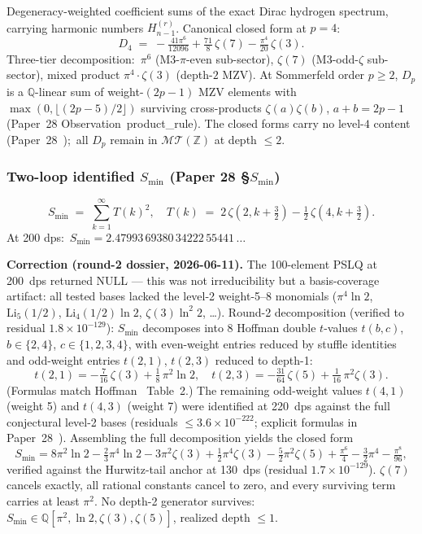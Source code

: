 \documentclass[11pt,a4paper]{article}
\theoremstyle{plain}
\theoremstyle{definition}
\newcommand{\Z}{\mathbb{Z}}
\newcommand{\Q}{\mathbb{Q}}
\newcommand{\MT}{\mathcal{MT}}
\begin{document}
Degeneracy-weighted coefficient sums of the exact Dirac hydrogen
spectrum, carrying harmonic numbers $H_{n-1}^{(r)}$.  Canonical closed form at $p = 4$:
\[
D_4 \;=\; -\tfrac{41\pi^6}{12096} + \tfrac{71}{8}\,\zeta(7)
        - \tfrac{\pi^4}{20}\,\zeta(3).
\]
Three-tier decomposition:\ $\pi^6$ (M3-$\pi$-even sub-sector),
$\zeta(7)$ (M3-odd-$\zeta$ sub-sector), mixed product
$\pi^4 \cdot \zeta(3)$ (depth-$2$ MZV).  At Sommerfeld order $p \ge 2$,
$D_p$ is a $\Q$-linear sum of weight-$(2p-1)$ MZV elements with
$\max(0, \lfloor (2p-5)/2 \rfloor)$ surviving cross-products
$\zeta(a)\zeta(b)$, $a + b = 2p-1$ (Paper~28
Observation~product\_rule).  The closed forms carry no level-$4$
content (Paper~28~\cite{loutey_paper28});\ all $D_p$ remain in $\MT(\Z)$
at depth $\le 2$.

\subsubsection{Two-loop identified $S_{\min}$ (Paper 28 \S $S_{\min}$)}
\label{subsec:m3_smin_witness}

\[
S_{\min} \;=\; \sum_{k=1}^\infty T(k)^2, \quad
T(k) \;=\; 2\,\zeta(2, k+\tfrac{3}{2}) - \tfrac{1}{2}\,\zeta(4, k+\tfrac{3}{2}).
\]
At 200 dps:\ $S_{\min} = 2.47993\,69380\,34222\,55441\,\ldots$

\textbf{Correction (round-2 dossier, 2026-06-11).}  The 100-element PSLQ
at 200~dps returned NULL --- this was not irreducibility but a
basis-coverage artifact: all tested bases lacked the level-2
weight-5--8 monomials ($\pi^4\ln 2$, $\mathrm{Li}_5(1/2)$,
$\mathrm{Li}_4(1/2)\ln 2$, $\zeta(3)\ln^2 2$, \ldots).
Round-2 decomposition (verified to residual $1.8\times10^{-129}$):
$S_{\min}$ decomposes into 8 Hoffman double $t$-values
$t(b,c)$, $b \in \{2,4\}$, $c \in \{1,2,3,4\}$, with
even-weight entries reduced by stuffle identities and odd-weight
entries $t(2,1)$, $t(2,3)$ reduced to depth-1:
\[
t(2,1) = -\tfrac{7}{16}\,\zeta(3) + \tfrac{1}{8}\,\pi^2\ln 2, \quad
t(2,3) = -\tfrac{31}{64}\,\zeta(5) + \tfrac{1}{16}\,\pi^2\zeta(3).
\]
(Formulas match Hoffman~\cite{hoffman2019odd} Table~2.)
The remaining odd-weight values $t(4,1)$ (weight 5) and $t(4,3)$
(weight 7) were identified at 220~dps against the full conjectural
level-2 bases (residuals $\le 3.6\times10^{-222}$; explicit formulas
in Paper~28~\cite{loutey_paper28}).  Assembling the full decomposition
yields the closed form
\[
S_{\min} = 8\pi^2\ln 2 - \tfrac{2}{3}\pi^4\ln 2 - 3\pi^2\zeta(3)
  + \tfrac{1}{2}\pi^4\zeta(3) - \tfrac{5}{2}\pi^2\zeta(5)
  + \tfrac{\pi^6}{4} - \tfrac{3}{2}\pi^4 - \tfrac{\pi^8}{96},
\]
verified against the Hurwitz-tail anchor at 130~dps (residual
$1.7\times10^{-129}$).  $\zeta(7)$ cancels exactly, all rational
constants cancel to zero, and every surviving term carries at least
$\pi^2$.  No depth-2 generator survives:\ $S_{\min} \in
\Q[\pi^2, \ln 2, \zeta(3), \zeta(5)]$, realized depth $\le 1$.
\end{document}

